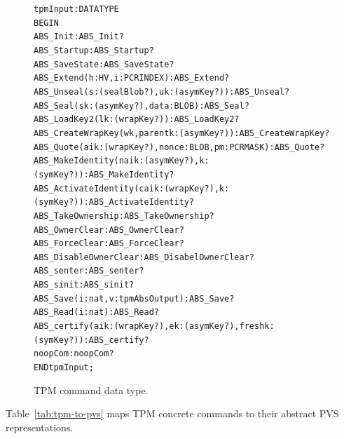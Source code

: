 \documentclass[10pt]{article}
\begin{document}
\begin{figure}
\begin{alltt}
  tpmInput : DATATYPE
  BEGIN
    ABS_Init : ABS_Init? 
    ABS_Startup : ABS_Startup? %
    ABS_SaveState : ABS_SaveState? %
    ABS_Extend(h:HV,i:PCRINDEX) : ABS_Extend?
    ABS_Unseal(s:(sealBlob?),uk:(asymKey?)) : ABS_Unseal?   
    ABS_Seal(sk:(asymKey?),data:BLOB) : ABS_Seal?
    ABS_LoadKey2(lk:(wrapKey?)): ABS_LoadKey2? 
    ABS_CreateWrapKey(wk,parentk:(asymKey?)): ABS_CreateWrapKey?
    ABS_Quote(aik:(wrapKey?),nonce:BLOB,pm:PCRMASK) : ABS_Quote?
    ABS_MakeIdentity(naik:(asymKey?),k:(symKey?)) : ABS_MakeIdentity?
    ABS_ActivateIdentity(caik:(wrapKey?),k:(symKey?)) : ABS_ActivateIdentity?
    ABS_TakeOwnership : ABS_TakeOwnership?
    ABS_OwnerClear : ABS_OwnerClear? %
    ABS_ForceClear : ABS_ForceClear? %
    ABS_DisableOwnerClear : ABS_DisabelOwnerClear? %
    ABS_senter : ABS_senter? %
    ABS_sinit : ABS_sinit? %
    ABS_Save(i:nat,v:tpmAbsOutput) : ABS_Save?
    ABS_Read(i:nat) : ABS_Read?
    ABS_certify(aik:(wrapKey?),ek:(asymKey?),freshk:(symKey?)) : ABS_certify?
    noopCom : noopCom?
  END tpmInput;
\end{alltt}
\caption{TPM command data type.}
\label{fig:tpm-command}
\end{figure}

Table~\ref{tab:tpm-to-pvs} maps TPM concrete commands to their
abstract PVS representations.
\end{document}
